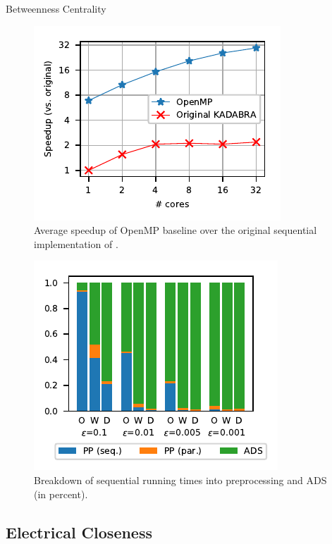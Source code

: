 \documentclass[10pt,titlepage,english,presentation]{beamer}
\begin{document}
\begin{frame}[t]{Betweenness Centrality}
\begin{minipage}[t]{.5\textwidth}
\centering
\begin{figure}
\centering
\includegraphics[width=.7\textwidth]{../sources/plots/betw-apx/original-vs-baseline.pdf}
\caption*{\scriptsize Average speedup of OpenMP baseline over
the original sequential implementation of \kadabra.}
\end{figure}
\end{minipage}\hfill
\begin{minipage}[t]{.5\textwidth}
\begin{figure}
\centering
\includegraphics[width=.7\textwidth]{../sources/plots/betw-apx/time-breakdown.pdf}
\caption*{\scriptsize Breakdown of sequential \kadabra running times into preprocessing and ADS
(in percent).}
\end{figure}
\end{minipage}
\end{frame}


\subsection{Electrical Closeness}
\end{document}
